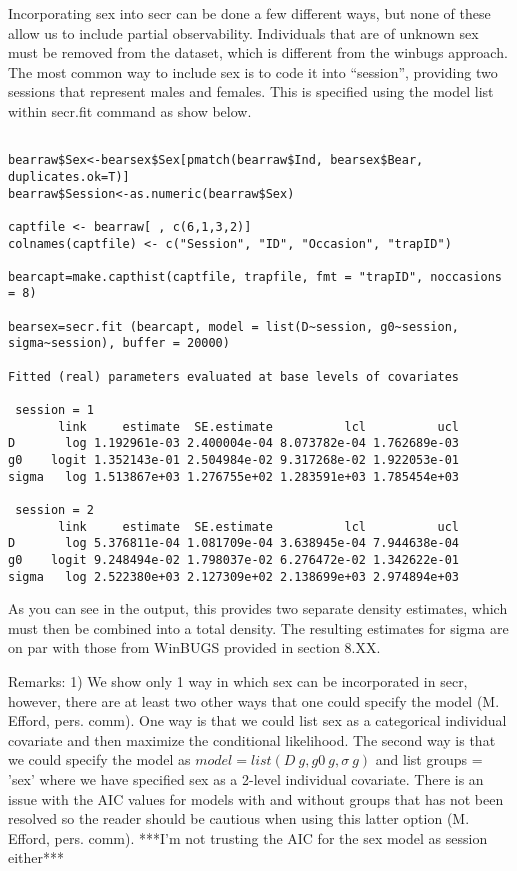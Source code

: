 Incorporating sex into secr can be done a few different ways, but none
of these allow us to include partial observability.   Individuals that
are of unknown sex must be removed from the dataset, which is
different from the winbugs approach.  The most common way to include
sex is to code it into ``session'', providing two sessions that
represent males and females.  This is specified using the model list
within secr.fit command as show below.
\begin{verbatim}

bearraw$Sex<-bearsex$Sex[pmatch(bearraw$Ind, bearsex$Bear, duplicates.ok=T)]
bearraw$Session<-as.numeric(bearraw$Sex)

captfile <- bearraw[ , c(6,1,3,2)] 
colnames(captfile) <- c("Session", "ID", "Occasion", "trapID")

bearcapt=make.capthist(captfile, trapfile, fmt = "trapID", noccasions = 8)

bearsex=secr.fit (bearcapt, model = list(D~session, g0~session, sigma~session), buffer = 20000)

Fitted (real) parameters evaluated at base levels of covariates 

 session = 1 
       link     estimate  SE.estimate          lcl          ucl
D       log 1.192961e-03 2.400004e-04 8.073782e-04 1.762689e-03
g0    logit 1.352143e-01 2.504984e-02 9.317268e-02 1.922053e-01
sigma   log 1.513867e+03 1.276755e+02 1.283591e+03 1.785454e+03

 session = 2 
       link     estimate  SE.estimate          lcl          ucl
D       log 5.376811e-04 1.081709e-04 3.638945e-04 7.944638e-04
g0    logit 9.248494e-02 1.798037e-02 6.276472e-02 1.342622e-01
sigma   log 2.522380e+03 2.127309e+02 2.138699e+03 2.974894e+03

\end{verbatim}

As you can see in the output, this provides two separate density estimates, which must then be combined into a total density.  The resulting estimates for sigma are on par with those from WinBUGS provided in section 8.XX.  

Remarks:   1) We show only 1 way in which sex can be incorporated in secr, however, there are at least two other ways that one could specify the model (M. Efford, pers. comm).  One way is that we could list sex as a categorical individual covariate and then maximize the conditional likelihood.  The second way is that we could specify the model as $model = list(D~g, g0~g, \sigma~g)$ and list groups = 'sex' where we have specified sex as a 2-level individual covariate.   There is an issue with the AIC values for models with and without groups that has not been resolved so the reader should be cautious when using this latter option (M. Efford, pers. comm).  ***I'm not trusting the AIC for the sex model as session either*** 

